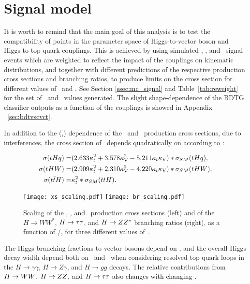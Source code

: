 
\section{Signal model}

It is worth to remind that the main goal of this analysis is to test the compatibility of points in the parameter space of Higgs-to-vector boson and Higgs-to-top quark couplings. This is achieved by using simulated \tHq, \tHW, and \ttH\ signal events which are weighted to reflect the impact of the couplings on kinematic distributions, and together with different predictions of the respective production cross sections and branching ratios, to produce limits on the cross section for different values of \CV\ and \Ct. See Section \ref{ssec:mc_signal} and Table~\ref{tab:reweight} for the set of \Ct\ and \CV\ values generated. The slight shape-dependence of the BDTG classifier outputs as a function of the couplings is showed in Appendix ~\ref{sec:bdtvscvct}.

In addition to the (\Ct,\CV) dependence of the \tHq\ and \tHW\ production cross sections, due to interferences, the cross section of \ttH\ depends quadratically on \Ct according to \cite{kcouplings}:

\begin{align}
\sigma(tHq) =& (2.633 \kappa_t^2 + 3.578 \kappa_\text{V}^2 - 5.211 \kappa_t\kappa_\text{V}) * \sigma_{SM}(tHq),\\
\sigma(tHW) =& (2.909 \kappa_t^2 + 2.310 \kappa_\text{V}^2 - 4.220 \kappa_t\kappa_\text{V}) * \sigma_{SM}(tHW),\\
\sigma(t\bar{t}H) =& \kappa_t^2 * \sigma_{SM}(ttH).
\end{align}

\begin{figure} [!h]
 \centering
  \texttt{[image: xs\_scaling.pdf]}
  \texttt{[image: br\_scaling.pdf]}
\caption[Scaling of the \tHq, \tHW, and \ttH\ production cross section  with \Ct/\CV.]{Scaling of the \tHq, \tHW, and \ttH\ production cross sections (left) and of the $H\to WW^*$, $H\to\tau\tau$, and $H\to ZZ^*$ branching ratios (right), as a function of \Ct/\CV, for three different values of \CV.}
\label{fig:xsbrscalings}
\end{figure}

The Higgs branching fractions to vector bosons depend on \CV, and the overall Higgs decay width depend both on \Ct\ and \CV\ when considering resolved top quark loops in the $H\to\gamma\gamma$, $H\to Z\gamma$, and $H\to gg$ decays. The relative contributions from $ H\to WW$, $H\to ZZ$, and $H\to\tau\tau$ also changes with changing \CV.

